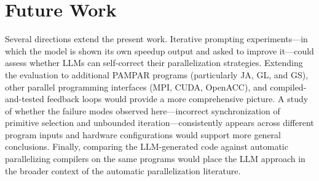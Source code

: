 \section{Future Work}
\label{sec:conclusion_future}

Several directions extend the present work. 
Iterative prompting experiments—in which the model is shown its own speedup output and asked to improve it—could assess whether LLMs can self-correct their parallelization strategies. 
Extending the evaluation to additional PAMPAR programs (particularly JA, GL, and GS), other parallel programming interfaces (MPI, CUDA, OpenACC), and compiled-and-tested feedback loops would provide a more comprehensive picture. 
A study of whether the failure modes observed here—incorrect synchronization of primitive selection and unbounded iteration—consistently appears across different program inputs and hardware configurations would support more general conclusions. 
Finally, comparing the LLM-generated code against automatic parallelizing compilers on the same programs would place the LLM approach in the broader context of the automatic parallelization literature.



